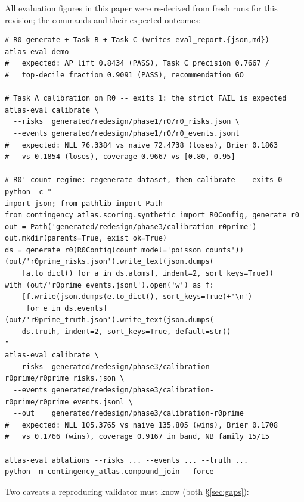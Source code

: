 \documentclass[11pt]{article}
\begin{document}
All evaluation figures in this paper were re-derived from fresh runs for
this revision; the commands and their expected outcomes:

\small
\begin{verbatim}
# R0 generate + Task B + Task C (writes eval_report.{json,md})
atlas-eval demo
#   expected: AP lift 0.8434 (PASS), Task C precision 0.7667 /
#   top-decile fraction 0.9091 (PASS), recommendation GO

# Task A calibration on R0 -- exits 1: the strict FAIL is expected
atlas-eval calibrate \
  --risks  generated/redesign/phase1/r0/r0_risks.json \
  --events generated/redesign/phase1/r0/r0_events.jsonl
#   expected: NLL 76.3384 vs naive 72.4738 (loses), Brier 0.1863
#   vs 0.1854 (loses), coverage 0.9667 vs [0.80, 0.95]

# R0' count regime: regenerate dataset, then calibrate -- exits 0
python -c "
import json; from pathlib import Path
from contingency_atlas.scoring.synthetic import R0Config, generate_r0
out = Path('generated/redesign/phase3/calibration-r0prime')
out.mkdir(parents=True, exist_ok=True)
ds = generate_r0(R0Config(count_model='poisson_counts'))
(out/'r0prime_risks.json').write_text(json.dumps(
    [a.to_dict() for a in ds.atoms], indent=2, sort_keys=True))
with (out/'r0prime_events.jsonl').open('w') as f:
    [f.write(json.dumps(e.to_dict(), sort_keys=True)+'\n')
     for e in ds.events]
(out/'r0prime_truth.json').write_text(json.dumps(
    ds.truth, indent=2, sort_keys=True, default=str))
"
atlas-eval calibrate \
  --risks  generated/redesign/phase3/calibration-r0prime/r0prime_risks.json \
  --events generated/redesign/phase3/calibration-r0prime/r0prime_events.jsonl \
  --out    generated/redesign/phase3/calibration-r0prime
#   expected: NLL 105.3765 vs naive 135.805 (wins), Brier 0.1708
#   vs 0.1766 (wins), coverage 0.9167 in band, NB family 15/15

atlas-eval ablations --risks ... --events ... --truth ...
python -m contingency_atlas.compound_join --force
\end{verbatim}
\normalsize

Two caveats a reproducing validator must know (both \S\ref{sec:gaps}):
\end{document}
